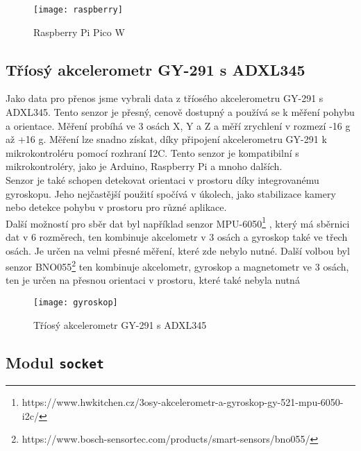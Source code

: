 \documentclass[12pt]{report}			%
\begin{document}
\begin{figure}[h]
\caption{Raspberry Pi Pico W}
\centering
\texttt{[image: raspberry]}
\end{figure}

\subsection{Tříosý akcelerometr GY-291 s ADXL345}

Jako data pro přenos jsme vybrali data z
tříosého akcelerometru GY-291 s ADXL345. Tento senzor je přesný, cenově dostupný a používá se k měření pohybu a orientace. Měření probíhá ve 3 osách X, Y a Z a měří zrychlení v rozmezí -16 g až +16 g. Měření lze snadno získat, díky připojení akcelerometru GY-291 k mikrokontroléru pomocí rozhraní I2C. Tento senzor je kompatibilní s mikrokontroléry, jako je Arduino, Raspberry Pi a mnoho dalších.
\\
Senzor je také schopen detekovat orientaci v prostoru díky integrovanému gyroskopu. Jeho nejčastější použití spočívá v úkolech, jako stabilizace kamery nebo detekce pohybu v prostoru pro různé aplikace.
\\
Další možností pro sběr dat byl například senzor MPU-6050\footnote{https://www.hwkitchen.cz/3osy-akcelerometr-a-gyroskop-gy-521-mpu-6050-i2c/}
, který má sběrnici dat v 6 rozměrech, ten kombinuje akcelometr v 3 osách a gyroskop také ve třech osách. Je určen na velmi přesné měření, které zde nebylo nutné. Další volbou byl senzor BNO055\footnote{https://www.bosch-sensortec.com/products/smart-sensors/bno055/}
 ten kombinuje akcelometr, gyroskop a magnetometr ve 3 osách, ten je určen na přesnou orientaci v prostoru, které také nebyla nutná\cite{gyroskop}

\begin{figure}[h]
\caption{Tříosý akcelerometr GY-291 s ADXL345}
\centering
\texttt{[image: gyroskop]}
\end{figure}

\subsection{Modul \texttt{socket}}
\end{document}
